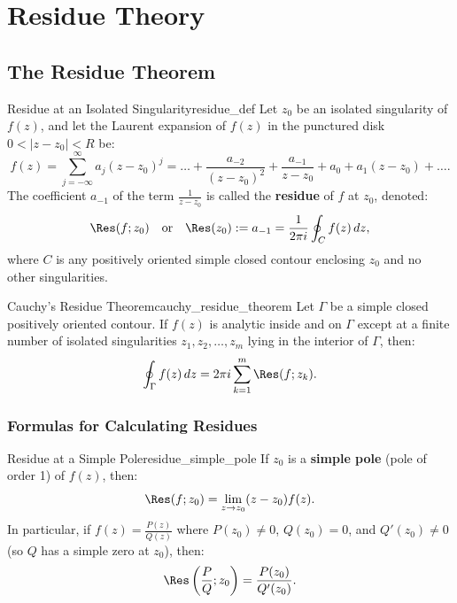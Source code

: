 \chapter{Residue Theory}

\section{The Residue Theorem}

\begin{definition}{Residue at an Isolated Singularity}{residue_def}
Let $z_0$ be an isolated singularity of $f(z)$, and let the Laurent expansion of $f(z)$ in the punctured disk $0 < |z - z_0| < R$ be:
\begin{equation}
f(z) = \sum_{j=-\infty}^\infty a_j (z - z_0)^j = \dots + \frac{a_{-2}}{(z - z_0)^2} + \frac{a_{-1}}{z - z_0} + a_0 + a_1(z - z_0) + \dots.
\end{equation}
The coefficient $a_{-1}$ of the term $\frac{1}{z - z_0}$ is called the \textbf{residue} of $f$ at $z_0$, denoted:
\begin{equation}
\Res(f; z_0) \quad \text{or} \quad \Res(z_0) := a_{-1} = \frac{1}{2\pi i} \oint_C f(z)\, dz,
\end{equation}
where $C$ is any positively oriented simple closed contour enclosing $z_0$ and no other singularities.
\end{definition}

\begin{theorem}{Cauchy's Residue Theorem}{cauchy_residue_theorem}
Let $\Gamma$ be a simple closed positively oriented contour. If $f(z)$ is analytic inside and on $\Gamma$ except at a finite number of isolated singularities $z_1, z_2, \dots, z_m$ lying in the interior of $\Gamma$, then:
\begin{equation}
\oint_\Gamma f(z)\, dz = 2\pi i \sum_{k=1}^m \Res(f; z_k).
\end{equation}
\end{theorem}

\subsection{Formulas for Calculating Residues}

\begin{proposition}{Residue at a Simple Pole}{residue_simple_pole}
If $z_0$ is a \textbf{simple pole} (pole of order 1) of $f(z)$, then:
\begin{equation}
\Res(f; z_0) = \lim_{z \to z_0} (z - z_0) f(z).
\end{equation}
In particular, if $f(z) = \frac{P(z)}{Q(z)}$ where $P(z_0) \neq 0$, $Q(z_0) = 0$, and $Q'(z_0) \neq 0$ (so $Q$ has a simple zero at $z_0$), then:
\begin{equation}
\Res\left(\frac{P}{Q}; z_0\right) = \frac{P(z_0)}{Q'(z_0)}.
\end{equation}
\end{proposition}

